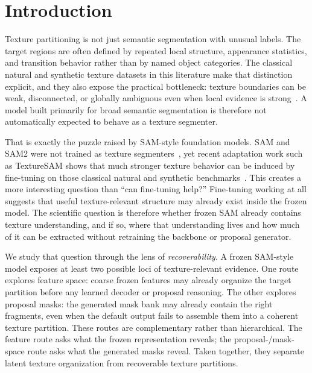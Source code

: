 \section{Introduction}
\label{sec:intro}

Texture partitioning is not just semantic segmentation with unusual labels. The target regions are often defined by repeated local structure, appearance statistics, and transition behavior rather than by named object categories. The classical natural and synthetic texture datasets in this literature make that distinction explicit, and they also expose the practical bottleneck: texture boundaries can be weak, disconnected, or globally ambiguous even when local evidence is strong~\cite{khan2015stld,khan2017c2f,khan2018learnedstld,mikes2022texturebenchmark}. A model built primarily for broad semantic segmentation is therefore not automatically expected to behave as a texture segmenter.

That is exactly the puzzle raised by SAM-style foundation models. SAM and SAM2 were not trained as texture segmenters~\cite{kirillov2023sam,ravi2024sam2}, yet recent adaptation work such as TextureSAM shows that much stronger texture behavior can be induced by fine-tuning on those classical natural and synthetic benchmarks~\cite{cohen2025texturesam,cohen2026texturesam}. This creates a more interesting question than ``can fine-tuning help?'' Fine-tuning working at all suggests that useful texture-relevant structure may already exist inside the frozen model. The scientific question is therefore whether frozen SAM already contains texture understanding, and if so, where that understanding lives and how much of it can be extracted without retraining the backbone or proposal generator.

We study that question through the lens of \emph{recoverability}. A frozen SAM-style model exposes at least two possible loci of texture-relevant evidence. One route explores feature space: coarse frozen features may already organize the target partition before any learned decoder or proposal reasoning. The other explores proposal masks: the generated mask bank may already contain the right fragments, even when the default output fails to assemble them into a coherent texture partition. These routes are complementary rather than hierarchical. The feature route asks what the frozen representation reveals; the proposal-/mask-space route asks what the generated masks reveal. Taken together, they separate latent texture organization from recoverable texture partitions.

